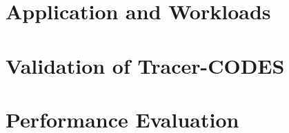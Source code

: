 

\section{Application and Workloads}


\section{Validation of Tracer-CODES}


\section{Performance Evaluation}


